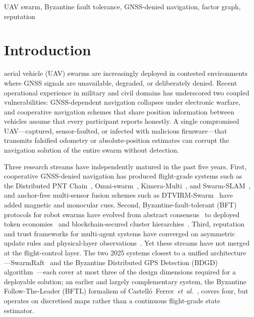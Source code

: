 \documentclass[conference,10pt]{IEEEtran}
\begin{document}
\begin{IEEEkeywords}
UAV swarm, Byzantine fault tolerance, GNSS-denied navigation, factor graph, reputation
\end{IEEEkeywords}

\section{Introduction}
\label{sec:intro}

 aerial vehicle (UAV) swarms are increasingly deployed in contested environments where GNSS signals are unavailable, degraded, or deliberately denied. Recent operational experience in military and civil domains has underscored two coupled vulnerabilities: GNSS-dependent navigation collapses under electronic warfare, and cooperative navigation schemes that share position information between vehicles assume that every participant reports honestly. A single compromised UAV---captured, sensor-faulted, or infected with malicious firmware---that transmits falsified odometry or absolute-position estimates can corrupt the navigation solution of the entire swarm without detection.

Three research streams have independently matured in the past five years. First, cooperative GNSS-denied navigation has produced flight-grade systems such as the Distributed PNT Chain~\cite{shapero2023distributed}, Omni-swarm~\cite{xu2022omniswarm}, Kimera-Multi~\cite{tian2022kimera}, and Swarm-SLAM~\cite{lajoie2024swarmslam}, and anchor-free multi-sensor fusion schemes such as DTVIRM-Swarm~\cite{dtvirm2026} have added magnetic and monocular cues. Second, Byzantine-fault-tolerant (BFT) protocols for robot swarms have evolved from abstract consensus~\cite{strobel2020blockchain} to deployed token economies~\cite{strobel2023robot} and blockchain-secured cluster hierarchies~\cite{alsamhi2023blockchain}. Third, reputation and trust frameworks for multi-agent systems have converged on asymmetric update rules and physical-layer observations~\cite{yemini2022characterizing,mallmanntrenn2022crowd,ballotta2025confidence}. Yet these streams have not merged at the flight-control layer. The two 2025 systems closest to a unified architecture---SwarmRaft~\cite{dev2025swarmraft} and the Byzantine Distributed GPS Detection (BDGD) algorithm~\cite{zhong2025bdgd}---each cover at most three of the design dimensions required for a deployable solution; an earlier and largely complementary system, the Byzantine Follow-The-Leader (BFTL) formalism of Castelló~Ferrer~\emph{et~al.}~\cite{castelloferrer2022bftl}, covers four, but operates on discretised maps rather than a continuous flight-grade state estimator.
\end{document}
